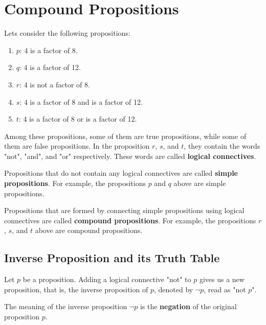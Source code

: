 \documentclass{report}
\newcounter{example}
\begin{document}
\section{Compound Propositions}

Lets consider the following propositions:
\begin{enumerate}[label=]
    \item $p$: 4 is a factor of 8.
    \item $q$: 4 is a factor of 12.
    \item $r$: 4 is not a factor of 8.
    \item $s$: 4 is a factor of 8 and is a factor of 12.
    \item $t$: 4 is a factor of 8 or is a factor of 12.
\end{enumerate}

Among these propositions, some of them are true propositions, while some of
them are false propositions. In the proposition $r$, $s$, and $t$, they contain
the words "not", "and", and "or" respectively. These words are called
\textbf{logical connectives}.

Propositions that do not contain any logical connectives are called
\textbf{simple propositions}. For example, the propositions $p$ and $q$ above
are simple propositions.

Propositions that are formed by connecting simple propositions using logical
connectives are called \textbf{compound propositions}. For example, the
propositions $r$, $s$, and $t$ above are compound propositions.

\subsection*{Inverse Proposition and its Truth Table}

Let $p$ be a proposition. Adding a logical connective "not" to $p$ gives us a
new proposition, that is, the inverse proposition of $p$, denoted by $\neg p$,
read as "not $p$".

The meaning of the inverse proposition $\neg p$ is the \textbf{negation} of the
original proposition $p$.
\end{document}
